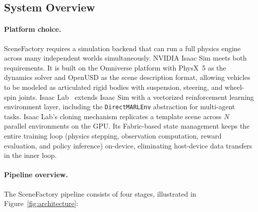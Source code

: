 \subsection{System Overview}
\label{sec:system_overview}

\paragraph{Platform choice.}
SceneFactory requires a simulation backend that can run a full physics engine across many independent worlds simultaneously.
NVIDIA Isaac Sim meets both requirements.
It is built on the Omniverse platform with PhysX~5 as the dynamics solver and OpenUSD as the scene description format, allowing vehicles to be modeled as articulated rigid bodies with suspension, steering, and wheel-spin joints.
Isaac Lab~\cite{mittal_orbit_2023} extends Isaac Sim with a vectorized reinforcement learning environment layer, including the \texttt{DirectMARLEnv} abstraction for multi-agent tasks.
Isaac Lab's cloning mechanism replicates a template scene across $N$ parallel environments on the GPU.
Its Fabric-based state management keeps the entire training loop (physics stepping, observation computation, reward evaluation, and policy inference) on-device, eliminating host-device data transfers in the inner loop.

\paragraph{Pipeline overview.}
The SceneFactory pipeline consists of four stages, illustrated in Figure~\ref{fig:architecture}:

